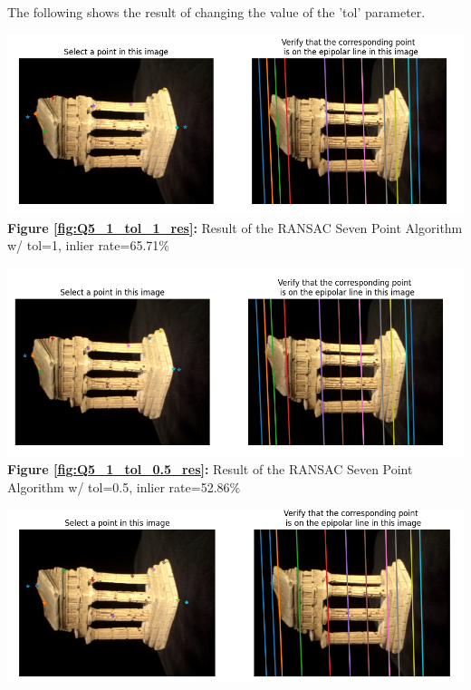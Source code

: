 \newpage
\begin{your_solution}[title=Q5.1 continued, height=22.5cm,width=\linewidth]
The following shows the result of changing the value of the 'tol' parameter.
\newline

\begin{minipage}{1\linewidth}
	\centering
	\includegraphics[width=1\linewidth, height=0.39\columnwidth]{../Q5_1_ransac_seven_tol_1_result.png}
	\textbf{Figure \ref{fig:Q5_1_tol_1_res}:} Result of the RANSAC Seven Point Algorithm w/ tol=1, inlier rate=65.71\% %
	\label{fig:Q5_1_tol_1_res}         %
\end{minipage}
\hfill
\begin{minipage}{1\linewidth}
	\centering
	\includegraphics[width=1\linewidth, height=0.39\columnwidth]{../Q5_1_ransac_seven_tol_0.5_result.png}
	\textbf{Figure \ref{fig:Q5_1_tol_0.5_res}:} Result of the RANSAC Seven Point Algorithm w/ tol=0.5, inlier rate=52.86\% %
	\label{fig:Q5_1_tol_0.5_res}         %
\end{minipage}
\hfill
\begin{minipage}{1\linewidth}
	\centering
	\includegraphics[width=1\linewidth, height=0.39\columnwidth]{../Q5_1_ransac_seven_tol_4_result.png}

\end{minipage}
\end{your_solution}
